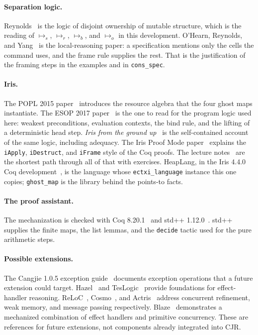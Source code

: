 \documentclass[11pt]{article}
\newcommand{\ptss}{\mathrel{\mapsto_{s}}}
\newcommand{\ptsr}{\mathrel{\mapsto_{r}}}
\newcommand{\ptsb}{\mathrel{\mapsto_{b}}}
\newcommand{\ptso}{\mathrel{\mapsto_{o}}}
\begin{document}
\paragraph{Separation logic.}
Reynolds~\cite{reynolds-lics02} is the logic of disjoint ownership of mutable structure, which is the reading of \(\ptss\), \(\ptsr\), \(\ptsb\), and \(\ptso\) in this development.
O'Hearn, Reynolds, and Yang~\cite{ohearn-csl01} is the local-reasoning paper: a specification mentions only the cells the command uses, and the frame rule supplies the rest.
That is the justification of the framing steps in the examples and in \texttt{cons\_spec}.

\paragraph{Iris.}
The POPL 2015 paper~\cite{iris-popl15} introduces the resource algebra that the four ghost maps instantiate.
The ESOP 2017 paper~\cite{iris-essence} is the one to read for the program logic used here: weakest preconditions, evaluation contexts, the bind rule, and the lifting of a deterministic head step.
\emph{Iris from the ground up}~\cite{iris-ground-up} is the self-contained account of the same logic, including adequacy.
The Iris Proof Mode paper~\cite{iris-ipm} explains the \texttt{iApply}, \texttt{iDestruct}, and \texttt{iFrame} style of the Coq proofs.
The lecture notes~\cite{iris-notes} are the shortest path through all of that with exercises.
HeapLang, in the Iris 4.4.0 Coq development~\cite{iris-coq}, is the language whose \texttt{ectxi\_language} instance this one copies; \texttt{ghost\_map} is the library behind the points-to facts.

\paragraph{The proof assistant.}
The mechanization is checked with Coq 8.20.1~\cite{coq} and std++ 1.12.0~\cite{stdpp}.
std++ supplies the finite maps, the list lemmas, and the \texttt{decide} tactic used for the pure arithmetic steps.

\paragraph{Possible extensions.}
The Cangjie 1.0.5 exception guide~\cite{cangjie-exceptions} documents exception operations that a future extension could target. Hazel~\cite{hazel-popl21} and TesLogic~\cite{teslogic-esop23} provide foundations for effect-handler reasoning. ReLoC~\cite{reloc-lmcs21}, Cosmo~\cite{cosmo-icfp20}, and Actris~\cite{actris-lmcs22} address concurrent refinement, weak memory, and message passing respectively. Blaze~\cite{blaze-popl26} demonstrates a mechanized combination of effect handlers and primitive concurrency. These are references for future extensions, not components already integrated into CJR.
\end{document}
